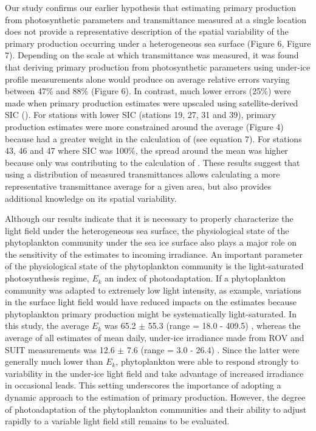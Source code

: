 Our study confirms our earlier hypothesis that estimating primary production from photosynthetic parameters and transmittance measured at a single location does not provide a representative description of the spatial variability of the primary production occurring under a heterogeneous sea surface (Figure 6, Figure 7). Depending on the scale at which transmittance was measured, it was found that deriving primary production from photosynthetic parameters using under-ice profile measurements alone would produce on average relative errors varying between 47\% and 88\% (Figure 6). In contrast, much lower errors (25\%) were made when primary production estimates were upscaled using satellite-derived SIC (\ppmixing{}). For stations with lower SIC (stations 19, 27, 31 and 39), primary production estimates were more constrained around the average (Figure 4) because \ppopenwater{} had a greater weight in the calculation of \ppmixing{} (see equation 7). For stations 43, 46 and 47 where SIC was 100\%, the spread around the mean was higher because only \ppunderice{} was contributing to the calculation of \ppmixing{}. These results suggest that using a distribution of measured transmittances allows calculating a more representative transmittance average for a given area, but also provides additional knowledge on its spatial variability.

Although our results indicate that it is necessary to properly characterize the light field under the heterogeneous sea surface, the physiological state of the phytoplankton community under the sea ice surface also plays a major role on the sensitivity of the estimates to incoming irradiance. An important parameter of the physiological state of the phytoplankton community is the light-saturated photosynthesis regime, $E_k$ an index of photoadaptation. If a phytoplankton community was adapted to extremely low light intensity, as example,  variations in the surface light field would have reduced impacts on the estimates because phytoplankton primary production might be systematically light-saturated. In this study, the average $E_k$ was 65.2 $\pm$ 55.3 (range = 18.0 - 409.5) \micromol{}, whereas the average of  all estimates of mean daily, under-ice irradiance made from ROV and SUIT measurements was 12.6 $\pm$ 7.6 (range = 3.0 - 26.4) \micromol{}. Since the latter were generally much lower than $E_k$, phytoplankton were able to respond strongly to variability in the under-ice light field and take advantage of increased irradiance in occasional leads. This setting underscores the importance of adopting a dynamic approach to the estimation of primary production. However, the degree of photoadaptation of the phytoplankton communities and their ability to adjust rapidly to a variable light field still remains to be evaluated.

